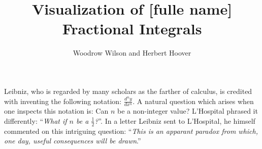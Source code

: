 \documentclass{article}
\theoremstyle{theorem}
\theoremstyle{definition}
\begin{document}
\title{Visualization of [fulle name] Fractional Integrals}
\author{Woodrow Wilson and Herbert Hoover} %

\maketitle



\noindent
Leibniz, who is regarded by many scholars as the farther of calculus, is credited with inventing the following notation: $\frac{d^n y}{d x^n}$. 
A natural question which arises when one inspects this notation is: Can $n$ be a non-integer value? L'Hospital phrased it differently: ``\emph{What if $n$ be a $\frac{1}{2}$?}''. 
In a letter Leibniz sent to L'Hospital, he himself commented on this intriguing question: ``\emph{This is an apparant paradox from which, one day, useful 
consequences will be drawn}.'' 
\end{document}
